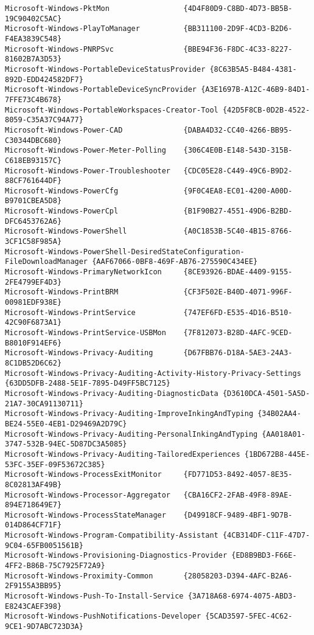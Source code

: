 \documentclass{report}
\begin{document}
\begin{lstlisting}[breaklines=true,basicstyle=\tiny]
Microsoft-Windows-PktMon                 {4D4F80D9-C8BD-4D73-BB5B-19C90402C5AC}
Microsoft-Windows-PlayToManager          {BB311100-2D9F-4CD3-B2D6-F4EA3839C548}
Microsoft-Windows-PNRPSvc                {BBE94F36-F8DC-4C33-8227-81602B7A3D53}
Microsoft-Windows-PortableDeviceStatusProvider {8C63B5A5-B484-4381-892D-EDD424582DF7}
Microsoft-Windows-PortableDeviceSyncProvider {A3E1697B-A12C-46B9-84D1-7FFE73C4B678}
Microsoft-Windows-PortableWorkspaces-Creator-Tool {42D5F8CB-0D2B-4522-8059-C35A37C94A77}
Microsoft-Windows-Power-CAD              {DABA4D32-CC40-4266-BB95-C30344DBC680}
Microsoft-Windows-Power-Meter-Polling    {306C4E0B-E148-543D-315B-C618EB93157C}
Microsoft-Windows-Power-Troubleshooter   {CDC05E28-C449-49C6-B9D2-88CF761644DF}
Microsoft-Windows-PowerCfg               {9F0C4EA8-EC01-4200-A00D-B9701CBEA5D8}
Microsoft-Windows-PowerCpl               {B1F90B27-4551-49D6-B2BD-DFC6453762A6}
Microsoft-Windows-PowerShell             {A0C1853B-5C40-4B15-8766-3CF1C58F985A}
Microsoft-Windows-PowerShell-DesiredStateConfiguration-FileDownloadManager {AAF67066-0BF8-469F-AB76-275590C434EE}
Microsoft-Windows-PrimaryNetworkIcon     {8CE93926-BDAE-4409-9155-2FE4799EF4D3}
Microsoft-Windows-PrintBRM               {CF3F502E-B40D-4071-996F-00981EDF938E}
Microsoft-Windows-PrintService           {747EF6FD-E535-4D16-B510-42C90F6873A1}
Microsoft-Windows-PrintService-USBMon    {7F812073-B28D-4AFC-9CED-B8010F914EF6}
Microsoft-Windows-Privacy-Auditing       {D67FBB76-D18A-5AE3-24A3-8C1DB52D6C62}
Microsoft-Windows-Privacy-Auditing-Activity-History-Privacy-Settings {63DD5DFB-2488-5E1F-7895-D49FF5BC7125}
Microsoft-Windows-Privacy-Auditing-DiagnosticData {D3610DCA-4501-5A5D-21A7-30CA91130711}
Microsoft-Windows-Privacy-Auditing-ImproveInkingAndTyping {34B02AA4-BE24-55E0-4EB1-D29469A2D79C}
Microsoft-Windows-Privacy-Auditing-PersonalInkingAndTyping {AA018A01-3747-532B-94EC-5D87DC3A5085}
Microsoft-Windows-Privacy-Auditing-TailoredExperiences {1BD672B8-445E-53FC-35EF-09F53672C385}
Microsoft-Windows-ProcessExitMonitor     {FD771D53-8492-4057-8E35-8C02813AF49B}
Microsoft-Windows-Processor-Aggregator   {CBA16CF2-2FAB-49F8-89AE-894E718649E7}
Microsoft-Windows-ProcessStateManager    {D49918CF-9489-4BF1-9D7B-014D864CF71F}
Microsoft-Windows-Program-Compatibility-Assistant {4CB314DF-C11F-47D7-9C04-65FB0051561B}
Microsoft-Windows-Provisioning-Diagnostics-Provider {ED8B9BD3-F66E-4FF2-B86B-75C7925F72A9}
Microsoft-Windows-Proximity-Common       {28058203-D394-4AFC-B2A6-2F9155A3BB95}
Microsoft-Windows-Push-To-Install-Service {3A718A68-6974-4075-ABD3-E8243CAEF398}
Microsoft-Windows-PushNotifications-Developer {5CAD3597-5FEC-4C62-9CE1-9D7ABC723D3A}

\end{lstlisting}
\end{document}
